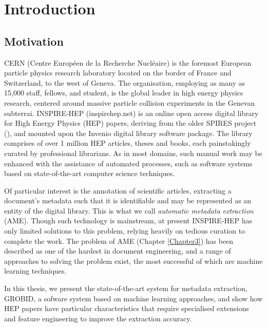 
\chapter{Introduction} %

\label{Chapter1} %



\section{Motivation}

CERN (Centre Europ\'een de la Recherche Nucl\'eaire) is the foremost European particle physics research laboratory located on the border of France and Switzerland, to the west of Geneva. The organisation, employing as many as 15,000 staff, fellows, and student, is the global leader in high energy physics research, centered around massive particle collision experiments in the Genevan subterrai. INSPIRE-HEP (inspirehep.net) is an online open access digital library for High Energy Physics (HEP) papers, deriving from the older SPIRES project (\cite{gentil2009information}), and mounted upon the Invenio digital library software package. The library comprises of over 1 million HEP articles, theses and books, each painstakingly curated by professional librarians. As in most domains, such manual work may be enhanced with the assistance of automated processes, such as software systems based on state-of-the-art computer science techniques.

Of particular interest is the annotation of scientific articles, extracting a document's metadata such that it is identifiable and may be represented as an entity of the digital library. This is what we call \emph{automatic metadata extraction} (AME). Though such technology is mainstream, at present INSPIRE-HEP has only limited solutions to this problem, relying heavily on tedious curation to complete the work. The problem of AME (Chapter \ref{Chapter3}) has been described as one of the hardest in document engineering, and a range of approaches to solving the problem exist, the most successful of which are machine learning techniques.

In this thesis, we present the state-of-the-art system for metadata extraction, GROBID, a sofware system based on machine learning approaches, and show how HEP papers have particular characteristics that require specialised extensions and feature engineering to improve the extraction accuracy.


